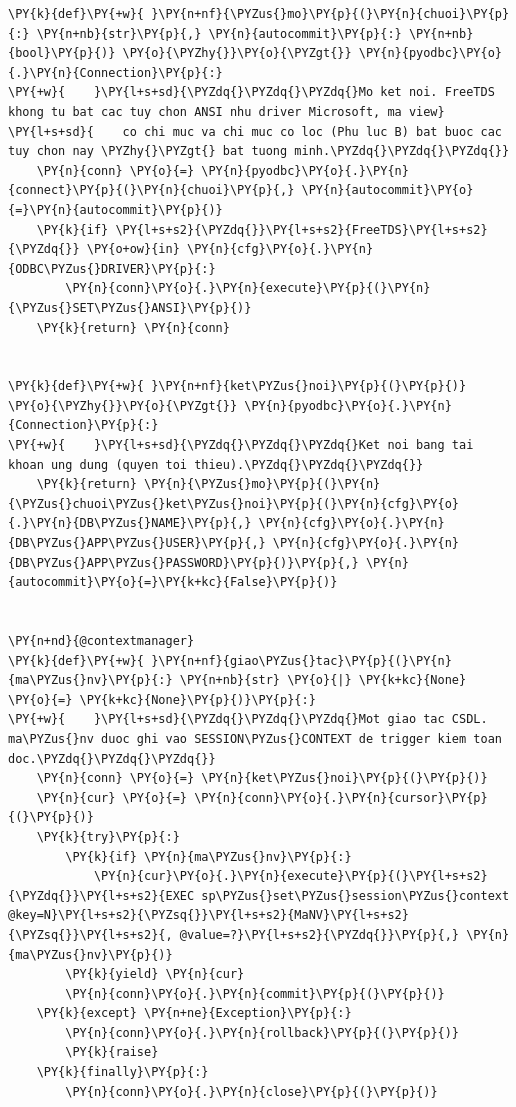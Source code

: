 \begin{Verbatim}[commandchars=\\\{\},frame=single,framerule=0.3pt,rulecolor=\color{black!40},fontsize=\footnotesize,breaklines=true]
\PY{k}{def}\PY{+w}{ }\PY{n+nf}{\PYZus{}mo}\PY{p}{(}\PY{n}{chuoi}\PY{p}{:} \PY{n+nb}{str}\PY{p}{,} \PY{n}{autocommit}\PY{p}{:} \PY{n+nb}{bool}\PY{p}{)} \PY{o}{\PYZhy{}}\PY{o}{\PYZgt{}} \PY{n}{pyodbc}\PY{o}{.}\PY{n}{Connection}\PY{p}{:}
\PY{+w}{    }\PY{l+s+sd}{\PYZdq{}\PYZdq{}\PYZdq{}Mo ket noi. FreeTDS khong tu bat cac tuy chon ANSI nhu driver Microsoft, ma view}
\PY{l+s+sd}{    co chi muc va chi muc co loc (Phu luc B) bat buoc cac tuy chon nay \PYZhy{}\PYZgt{} bat tuong minh.\PYZdq{}\PYZdq{}\PYZdq{}}
    \PY{n}{conn} \PY{o}{=} \PY{n}{pyodbc}\PY{o}{.}\PY{n}{connect}\PY{p}{(}\PY{n}{chuoi}\PY{p}{,} \PY{n}{autocommit}\PY{o}{=}\PY{n}{autocommit}\PY{p}{)}
    \PY{k}{if} \PY{l+s+s2}{\PYZdq{}}\PY{l+s+s2}{FreeTDS}\PY{l+s+s2}{\PYZdq{}} \PY{o+ow}{in} \PY{n}{cfg}\PY{o}{.}\PY{n}{ODBC\PYZus{}DRIVER}\PY{p}{:}
        \PY{n}{conn}\PY{o}{.}\PY{n}{execute}\PY{p}{(}\PY{n}{\PYZus{}SET\PYZus{}ANSI}\PY{p}{)}
    \PY{k}{return} \PY{n}{conn}


\PY{k}{def}\PY{+w}{ }\PY{n+nf}{ket\PYZus{}noi}\PY{p}{(}\PY{p}{)} \PY{o}{\PYZhy{}}\PY{o}{\PYZgt{}} \PY{n}{pyodbc}\PY{o}{.}\PY{n}{Connection}\PY{p}{:}
\PY{+w}{    }\PY{l+s+sd}{\PYZdq{}\PYZdq{}\PYZdq{}Ket noi bang tai khoan ung dung (quyen toi thieu).\PYZdq{}\PYZdq{}\PYZdq{}}
    \PY{k}{return} \PY{n}{\PYZus{}mo}\PY{p}{(}\PY{n}{\PYZus{}chuoi\PYZus{}ket\PYZus{}noi}\PY{p}{(}\PY{n}{cfg}\PY{o}{.}\PY{n}{DB\PYZus{}NAME}\PY{p}{,} \PY{n}{cfg}\PY{o}{.}\PY{n}{DB\PYZus{}APP\PYZus{}USER}\PY{p}{,} \PY{n}{cfg}\PY{o}{.}\PY{n}{DB\PYZus{}APP\PYZus{}PASSWORD}\PY{p}{)}\PY{p}{,} \PY{n}{autocommit}\PY{o}{=}\PY{k+kc}{False}\PY{p}{)}


\PY{n+nd}{@contextmanager}
\PY{k}{def}\PY{+w}{ }\PY{n+nf}{giao\PYZus{}tac}\PY{p}{(}\PY{n}{ma\PYZus{}nv}\PY{p}{:} \PY{n+nb}{str} \PY{o}{|} \PY{k+kc}{None} \PY{o}{=} \PY{k+kc}{None}\PY{p}{)}\PY{p}{:}
\PY{+w}{    }\PY{l+s+sd}{\PYZdq{}\PYZdq{}\PYZdq{}Mot giao tac CSDL. ma\PYZus{}nv duoc ghi vao SESSION\PYZus{}CONTEXT de trigger kiem toan doc.\PYZdq{}\PYZdq{}\PYZdq{}}
    \PY{n}{conn} \PY{o}{=} \PY{n}{ket\PYZus{}noi}\PY{p}{(}\PY{p}{)}
    \PY{n}{cur} \PY{o}{=} \PY{n}{conn}\PY{o}{.}\PY{n}{cursor}\PY{p}{(}\PY{p}{)}
    \PY{k}{try}\PY{p}{:}
        \PY{k}{if} \PY{n}{ma\PYZus{}nv}\PY{p}{:}
            \PY{n}{cur}\PY{o}{.}\PY{n}{execute}\PY{p}{(}\PY{l+s+s2}{\PYZdq{}}\PY{l+s+s2}{EXEC sp\PYZus{}set\PYZus{}session\PYZus{}context @key=N}\PY{l+s+s2}{\PYZsq{}}\PY{l+s+s2}{MaNV}\PY{l+s+s2}{\PYZsq{}}\PY{l+s+s2}{, @value=?}\PY{l+s+s2}{\PYZdq{}}\PY{p}{,} \PY{n}{ma\PYZus{}nv}\PY{p}{)}
        \PY{k}{yield} \PY{n}{cur}
        \PY{n}{conn}\PY{o}{.}\PY{n}{commit}\PY{p}{(}\PY{p}{)}
    \PY{k}{except} \PY{n+ne}{Exception}\PY{p}{:}
        \PY{n}{conn}\PY{o}{.}\PY{n}{rollback}\PY{p}{(}\PY{p}{)}
        \PY{k}{raise}
    \PY{k}{finally}\PY{p}{:}
        \PY{n}{conn}\PY{o}{.}\PY{n}{close}\PY{p}{(}\PY{p}{)}



\end{Verbatim}
